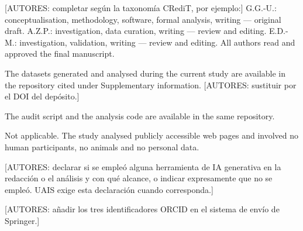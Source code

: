 \documentclass[pdflatex,sn-basic,Numbered]{sn-jnl}
\theoremstyle{thmstyleone}
\theoremstyle{thmstyletwo}
\theoremstyle{thmstylethree}
\begin{document}
\textcolor{gris}{[AUTORES: completar seg\'un la taxonom\'ia CRediT, por ejemplo:]} G.G.-U.: conceptualisation, methodology, software, formal analysis, writing --- original draft. A.Z.P.: investigation, data curation, writing --- review and editing. E.D.-M.: investigation, validation, writing --- review and editing. All authors read and approved the final manuscript.

The datasets generated and analysed during the current study are available in the repository cited under Supplementary information. \textcolor{gris}{[AUTORES: sustituir por el DOI del dep\'osito.]}

The audit script and the analysis code are available in the same repository.

Not applicable. The study analysed publicly accessible web pages and involved no human participants, no animals and no personal data.

\textcolor{gris}{[AUTORES: declarar si se emple\'o alguna herramienta de IA generativa en la redacci\'on o el an\'alisis y con qu\'e alcance, o indicar expresamente que no se emple\'o. UAIS exige esta declaraci\'on cuando corresponda.]}

\textcolor{gris}{[AUTORES: a\~nadir los tres identificadores ORCID en el sistema de env\'io de Springer.]}
\end{document}
